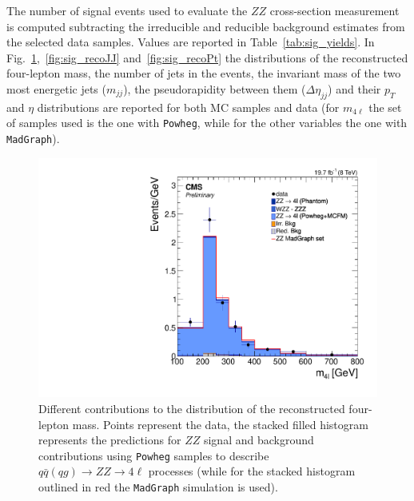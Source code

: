 The number of signal events used to evaluate the $ZZ$ cross-section measurement is computed subtracting the irreducible and 
reducible background estimates from the selected data samples. Values are reported in Table~\ref{tab:sig_yields}. 
In Fig.~\ref{fig:sig_recoMass},~\ref{fig:sig_recoJJ} and~\ref{fig:sig_recoPt} the distributions of the reconstructed four-lepton mass, the number of jets in the events, the invariant mass of the two most energetic jets ($m_{jj}$), the pseudorapidity between them ($\Delta\eta_{jj}$) and their $p_{T}$ and $\eta$ distributions 
are reported for both MC samples and data (for $m_{4\ell}$ the set of samples used is the one with \texttt{Powheg}, while for the other variables the one 
with \texttt{MadGraph}).\\  

\begin{figure}[hbtp]
  \begin{center}
    \includegraphics[width=\cmsFigWidth]{Figures/Mass_pow} 
    \caption{Different contributions to the distribution of the reconstructed four-lepton mass. Points represent the data, the stacked filled histogram represents the predictions for $ZZ$ signal and background contributions using \texttt{Powheg} samples to describe $q\bar{q}(qg)\to ZZ\to 4\ell$ processes (while for the stacked histogram outlined in red the \texttt{MadGraph} simulation is used).}
    \label{fig:sig_recoMass}
  \end{center}
\end{figure}
 
